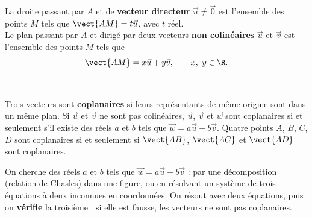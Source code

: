 \noindent
\begin{minipage}[c]{0.56\linewidth}
\begin{definition}
\raggedright
La droite passant par $A$ et de \textbf{vecteur directeur} $\vec u\neq\vec0$ est l'ensemble des points $M$ tels que $\vect{AM}=t\vec u$,
avec $t$ réel.\\[1mm]
Le plan passant par $A$ et dirigé par deux vecteurs \textbf{non colinéaires} $\vec u$ et $\vec v$ est l'ensemble des points $M$ tels que
\[\vect{AM}=x\vec u+y\vec v,\qquad x,\ y\in\R.\]
\end{definition}
\end{minipage}\hfill
\begin{minipage}[c]{0.4\linewidth}
\centering
{}\\[0.5mm]
\end{minipage}

\begin{propriete}
Trois vecteurs sont \textbf{coplanaires} si leurs représentants de même origine sont dans un même plan. Si $\vec u$ et $\vec v$ ne sont
pas colinéaires, $\vec u$, $\vec v$ et $\vec w$ sont coplanaires si et seulement s'il existe des réels $a$ et $b$ tels que
$\vec w=a\vec u+b\vec v$. Quatre points $A$, $B$, $C$, $D$ sont coplanaires si et seulement si $\vect{AB}$, $\vect{AC}$ et
$\vect{AD}$ sont coplanaires.
\end{propriete}

\begin{savoirfaire}
On cherche des réels $a$ et $b$ tels que $\vec w=a\vec u+b\vec v$ : par une décomposition (relation de Chasles) dans une figure, ou en
résolvant un système de trois équations à deux inconnues en coordonnées. On résout avec deux équations, puis on \textbf{vérifie} la
troisième : si elle est fausse, les vecteurs ne sont pas coplanaires.
\end{savoirfaire}

